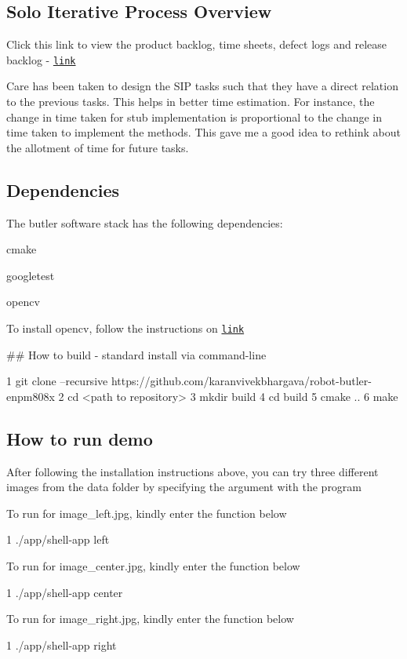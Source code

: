  \subsection*{Solo Iterative Process Overview}

Click this link to view the product backlog, time sheets, defect logs and release backlog -\/ \href{https://docs.google.com/spreadsheets/d/1WOvV6iL4gGOF8Qacwj2R3Lom71wziKXEf_UEhdGfOuY/edit?usp=sharing}{\tt link}

Care has been taken to design the S\+IP tasks such that they have a direct relation to the previous tasks. This helps in better time estimation. For instance, the change in time taken for stub implementation is proportional to the change in time taken to implement the methods. This gave me a good idea to rethink about the allotment of time for future tasks. 

 \subsection*{Dependencies}

The butler software stack has the following dependencies\+:
\begin{DoxyItemize}
\item cmake
\item googletest
\item opencv
\end{DoxyItemize}

To install opencv, follow the instructions on \href{https://docs.opencv.org/trunk/d7/d9f/tutorial_linux_install.html}{\tt link}

\#\# How to build -\/ standard install via command-\/line 
\begin{DoxyCode}
1 git clone --recursive https://github.com/karanvivekbhargava/robot-butler-enpm808x
2 cd <path to repository>
3 mkdir build
4 cd build
5 cmake ..
6 make
\end{DoxyCode}


\subsection*{How to run demo}

After following the installation instructions above, you can try three different images from the data folder by specifying the argument with the program

To run for image\+\_\+left.\+jpg, kindly enter the function below 
\begin{DoxyCode}
1 ./app/shell-app left
\end{DoxyCode}
 To run for image\+\_\+center.\+jpg, kindly enter the function below 
\begin{DoxyCode}
1 ./app/shell-app center
\end{DoxyCode}
 To run for image\+\_\+right.\+jpg, kindly enter the function below 
\begin{DoxyCode}
1 ./app/shell-app right
\end{DoxyCode}


